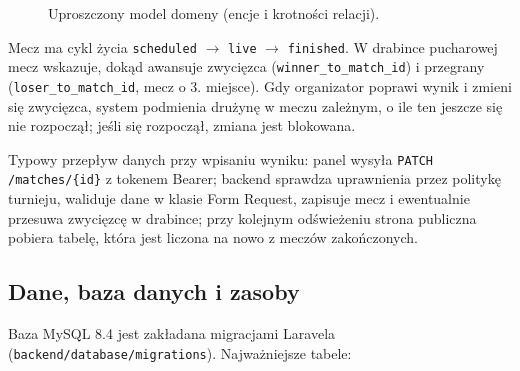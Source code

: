 \documentclass[11pt,a4paper,oneside]{article}
\newif\ifpodpowiedzi
\newcommand{\podpowiedz}[1]{\ifpodpowiedzi\par\begingroup\small\color{hintcolor}\textit{Wskazówka: #1}\par\endgroup\fi}
\begin{document}
\begin{figure}[htbp]
\centering
{}
\caption{Uproszczony model domeny (encje i krotności relacji).}
\label{fig:model}
\end{figure}

Mecz ma cykl życia \texttt{scheduled} $\rightarrow$ \texttt{live} $\rightarrow$ \texttt{finished}. W drabince pucharowej mecz wskazuje, dokąd awansuje zwycięzca (\texttt{winner\_to\_match\_id}) i przegrany (\texttt{loser\_to\_match\_id}, mecz o 3. miejsce). Gdy organizator poprawi wynik i zmieni się zwycięzca, system podmienia drużynę w meczu zależnym, o ile ten jeszcze się nie rozpoczął; jeśli się rozpoczął, zmiana jest blokowana.

Typowy przepływ danych przy wpisaniu wyniku: panel wysyła \texttt{PATCH /matches/\{id\}} z tokenem Bearer; backend sprawdza uprawnienia przez politykę turnieju, waliduje dane w klasie Form Request, zapisuje mecz i ewentualnie przesuwa zwycięzcę w drabince; przy kolejnym odświeżeniu strona publiczna pobiera tabelę, która jest liczona na nowo z meczów zakończonych.

\subsection{Dane, baza danych i zasoby}
\podpowiedz{Jeśli projekt korzysta z bazy danych, opisz schemat, tabele, klucze, relacje, ograniczenia i istotne procedury. Dla innych danych lub zasobów określ formaty, strukturę, pochodzenie oraz sposób przygotowania i wykorzystania. Dla animacji mogą to być modele, tekstury, materiały i pliki dźwiękowe. Wskaż zasoby własne i zewnętrzne oraz warunki ich wykorzystania.}
Baza MySQL 8.4 jest zakładana migracjami Laravela (\texttt{backend/database/migrations}). Najważniejsze tabele:
\end{document}
